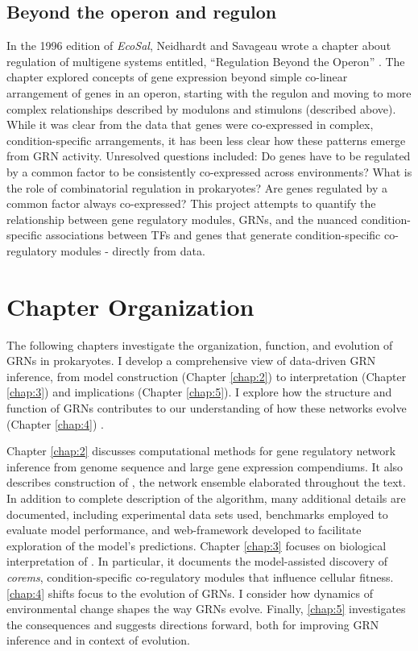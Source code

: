 \subsection{Beyond the operon and regulon}

In the 1996 edition of \textit{EcoSal}, Neidhardt and Savageau wrote a chapter about regulation of multigene systems entitled, ``Regulation Beyond the Operon'' \cite{neidhardt_escherichia_1996}. The chapter explored concepts of gene expression beyond simple co-linear arrangement of genes in an operon, starting with the regulon and moving to more complex relationships described by modulons and stimulons (described above). While it was clear from the data that genes were co-expressed in complex, condition-specific arrangements, it has been less clear how these patterns emerge from GRN activity. Unresolved questions included: Do genes have to be regulated by a common factor to be consistently co-expressed across environments? What is the role of combinatorial regulation in prokaryotes? Are genes regulated by a common factor always co-expressed? This project attempts to quantify the relationship between gene regulatory modules, GRNs, and the nuanced condition-specific associations between TFs and genes that generate condition-specific co-regulatory modules - directly from data. 

\section{Chapter Organization}

The following chapters investigate the organization, function, and evolution of GRNs in prokaryotes. I develop a comprehensive view of data-driven GRN inference, from model construction (Chapter \ref{chap:2}) to interpretation (Chapter \ref{chap:3}) and implications (Chapter \ref{chap:5}). I explore how the structure and function of GRNs contributes to our understanding of how these networks evolve (Chapter \ref{chap:4}) . 

Chapter \ref{chap:2} discusses computational methods for gene regulatory network inference from genome sequence and large gene expression compendiums. It also describes construction of \egrine, the network ensemble elaborated throughout the text. In addition to complete description of the algorithm, many additional details are documented, including experimental data sets used, benchmarks employed to evaluate model performance, and web-framework developed to facilitate exploration of the model's predictions. Chapter \ref{chap:3} focuses on biological interpretation of \egrine. In particular, it documents the model-assisted discovery of \textit{corems}, condition-specific co-regulatory modules that influence cellular fitness. \ref{chap:4} shifts focus to the evolution of GRNs. I consider how dynamics of environmental change shapes the way GRNs evolve. Finally, \ref{chap:5} investigates the consequences and suggests directions forward, both for improving GRN inference and in context of evolution. 


 

 
 